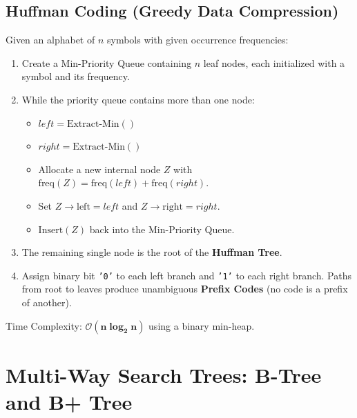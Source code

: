 \documentclass[12pt,a4paper]{article}
\begin{document}
\subsection{Huffman Coding (Greedy Data Compression)}
\begin{tcolorbox}[defbox, title={\textbf{Huffman Algorithm for Optimal Prefix Codes}}]
Given an alphabet of $n$ symbols with given occurrence frequencies:
\begin{enumerate}[leftmargin=*, nosep]
  \item Create a Min-Priority Queue containing $n$ leaf nodes, each initialized with a symbol and its frequency.
  \item While the priority queue contains more than one node:
  \begin{itemize}[leftmargin=*, nosep]
    \item $left = \text{Extract-Min}()$
    \item $right = \text{Extract-Min}()$
    \item Allocate a new internal node $Z$ with $\text{freq}(Z) = \text{freq}(left) + \text{freq}(right)$.
    \item Set $Z\to\text{left} = left$ and $Z\to\text{right} = right$.
    \item $\text{Insert}(Z)$ back into the Min-Priority Queue.
  \end{itemize}
  \item The remaining single node is the root of the \textbf{Huffman Tree}.
  \item Assign binary bit \texttt{'0'} to each left branch and \texttt{'1'} to each right branch. Paths from root to leaves produce unambiguous \textbf{Prefix Codes} (no code is a prefix of another).
\end{enumerate}
Time Complexity: $\mathbf{\mathcal{O}(n \log_2 n)}$ using a binary min-heap.
\end{tcolorbox}

\section{Multi-Way Search Trees: B-Tree and B+ Tree}
\end{document}
